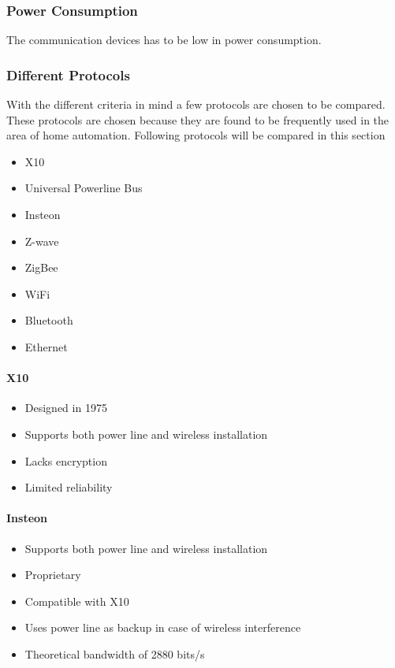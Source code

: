 \subsubsection{Power Consumption}
The communication devices has to be low in power consumption.

\subsubsection{Different Protocols}
With the different criteria in mind a few protocols are chosen to be compared. These protocols are chosen because they are found to be frequently used in the area of home automation.
Following protocols will be compared in this section

\begin{itemize}
\item X10
\item Universal Powerline Bus
\item Insteon
\item Z-wave
\item ZigBee
\item WiFi
\item Bluetooth
\item Ethernet
\end{itemize}


\paragraph{X10} \cite{wiki_x10}

\begin{itemize}
\item Designed in 1975
\item Supports both power line and wireless installation
\item Lacks encryption
\item Limited reliability
\end{itemize}


\paragraph{Insteon} \cite{wiki_insteon}

\begin{itemize}
\item Supports both power line and wireless installation
\item Proprietary
\item Compatible with X10
\item Uses power line as backup in case of wireless interference
\item Theoretical bandwidth of 2880 bits/s
\end{itemize}


